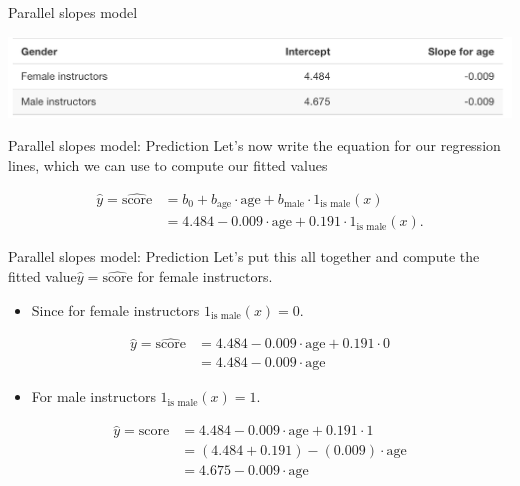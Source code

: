 \documentclass[
  ignorenonframetext,
]{beamer}
\providecommand{\tightlist}{%
  \setlength{\itemsep}{0pt}\setlength{\parskip}{0pt}}
\begin{document}
\begin{frame}[fragile]{Parallel slopes model}
\normalsize

\begin{center}\includegraphics[width=0.6\linewidth,height=0.2\textheight]{week5_3} \end{center}
\end{frame}

\begin{frame}{Parallel slopes model: Prediction}
\protect\hypertarget{parallel-slopes-model-prediction}{}
Let's now write the equation for our regression lines, which we can use
to compute our fitted values

\[\begin{array}{ll}
\hat{y}=\widehat{\text{score}}&=b_0+b_{\text{age}}\cdot \text{age}+b_{\text{male}}\cdot 1_{\text{is male}}(x)\\
&=4.484-0.009\cdot \text{age}+0.191\cdot 1_{\text{is male}}(x).
\end{array}\]
\end{frame}

\begin{frame}{Parallel slopes model: Prediction}
\protect\hypertarget{parallel-slopes-model-prediction-1}{}
Let's put this all together and compute the fitted
value\(\hat{y}=\widehat{\text{score}}\) for female instructors.

\begin{itemize}
\tightlist
\item
  Since for female instructors \(1_{\text{is male}}(x)=0\).
\end{itemize}

\[\begin{array}{ll}
\hat{y}=\widehat{\text{score}}&=4.484-0.009\cdot \text{age}+0.191\cdot 0\\
&=4.484-0.009\cdot \text{age}
\end{array}\]

\begin{itemize}
\tightlist
\item
  For male instructors \(1_{\text{is male}}(x)=1\).
\end{itemize}

\[\begin{array}{ll}
\hat{y}=\widehat{\text{score}}&=4.484-0.009\cdot \text{age}+0.191\cdot 1\\
&=(4.484+0.191)-(0.009)\cdot \text{age}\\
&=4.675-0.009\cdot \text{age}
\end{array}\]
\end{frame}
\end{document}
